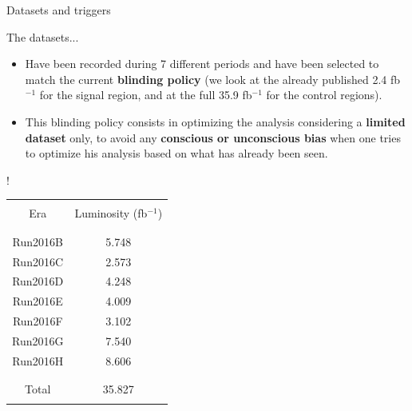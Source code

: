 \documentclass[8 pt]{beamer}
\begin{document}
\begin{frame}{Datasets and triggers}

	\begin{exampleblock}{} The datasets... \end{exampleblock}
	
	\vspace{8pt}
	\begin{minipage}[c]{.59\linewidth}
	\begin{itemize}
	\justifying
	\item Have been recorded during 7 different periods and have been selected to match the current \textbf{blinding policy} (we look at the already published 2.4 fb$^{-1}$ for the signal region, and at the full 35.9 fb$^{-1}$ for the control regions). \\ \vspace{8pt}
	\item This blinding policy consists in optimizing the analysis considering a \textbf{limited dataset} only, to avoid any \textbf{conscious or unconscious bias} when one tries to optimize his analysis based on what has already been seen.
	\end{itemize} \vfill
   	\end{minipage} \hfill
   	\begin{minipage}[c]{.39\linewidth}
	\begin{center}
	\resizebox{95pt} {!}{
	\begin{tabular}{c|c}
		& \\
		Era & Luminosity (fb$^{-1}$) \\
		& \\
		\hline \hline
		& \\
		Run2016B & 5.748 \\
		Run2016C & 2.573 \\
		Run2016D & 4.248 \\
		Run2016E & 4.009 \\
		Run2016F & 3.102 \\
		Run2016G & 7.540 \\
		Run2016H & 8.606 \\ 
		& \\ 
		\hline
		& \\
		Total & 35.827 \\
		& \\
	\end{tabular}
	}
	\end{center}
   	\end{minipage} \hfill \vfill	
	

\end{frame}
\end{document}
